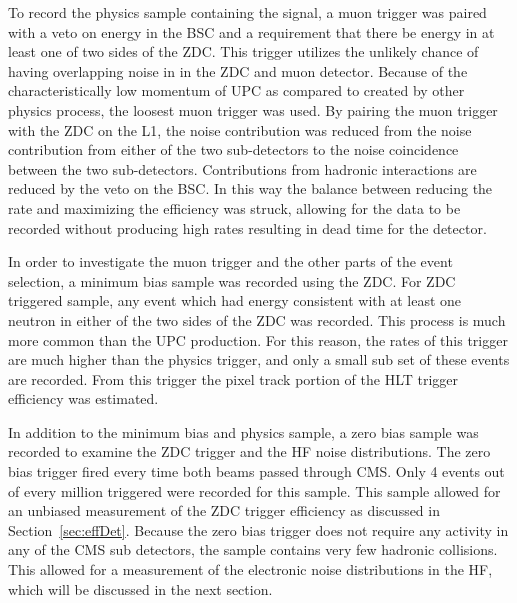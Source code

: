       To record the physics sample containing the \DIFdelbegin {}\DIFdelend \DIFaddbegin {}\DIFaddend signal, a muon trigger
        was paired with a veto on energy in the BSC and a requirement that there 
        be energy in at least one of two sides of the ZDC. 
      This trigger utilizes the unlikely chance of having overlapping noise in
        in the ZDC and muon detector.
      Because of the characteristically low momentum of UPC \DIFdelbegin {}\DIFdelend \DIFaddbegin {}\DIFaddend as compared
        to \DIFdelbegin {}\DIFdelend \DIFaddbegin {}\DIFaddend created by other physics process, the loosest muon 
        trigger was used.
      By pairing the muon trigger with the ZDC on the L1, the noise contribution
        was reduced from the noise contribution from either of the two 
        sub-detectors to the noise coincidence between the two sub-detectors. 
      Contributions from hadronic interactions are reduced by the veto on the 
        BSC.
      In this way the balance between reducing the rate and maximizing the 
        efficiency was struck, allowing for the data to be recorded without 
        producing high rates resulting in dead time for the detector.  

      In order to investigate the muon trigger and the other parts of the event 
        selection, a minimum bias sample was recorded using the ZDC. 
      For ZDC triggered sample, any event which had energy consistent with at 
        least one neutron in either of the two sides of the ZDC was recorded.
      This process is much more common than the UPC \DIFdelbegin {}\DIFdelend \DIFaddbegin {}\DIFaddend production.
      For this reason, the rates of this trigger are much higher than the physics
        trigger, and only a small sub set of these events are recorded.
      From this trigger the pixel track portion of the HLT trigger efficiency 
        was estimated. 

      In addition to the minimum bias and physics sample, a zero bias sample was 
        recorded to examine the ZDC trigger and the HF noise distributions. 
      The zero bias trigger fired every time both beams passed through CMS. 
      Only 4 events out of every million triggered were recorded for this sample. 
      This sample allowed for an unbiased measurement of the ZDC trigger 
      efficiency as discussed in Section~\ref{sec:effDet}. 
      Because the zero bias trigger does not require any activity in any of the
        CMS sub detectors, the sample contains very few hadronic collisions. 
      This allowed for a measurement of the electronic noise distributions in
        the HF, which will be discussed in the next section.

